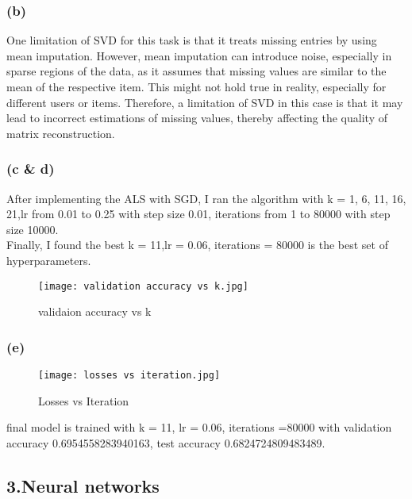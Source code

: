 \documentclass[12pt]{article}
\begin{document}
\subsubsection*{(b)}
One limitation of SVD for this task is that it treats missing entries by using mean imputation. However,
mean imputation can introduce noise, especially in sparse regions of the data, as it assumes that missing values are similar
to the mean of the respective item. This might not hold true in reality, especially for different users or items. Therefore,
a limitation of SVD in this case is that it may lead to incorrect estimations of missing values, thereby affecting the quality
of matrix reconstruction.


\subsubsection*{(c \& d)}
After implementing the ALS with SGD, I ran the algorithm with k = 1, 6, 11, 16, 21,lr from 0.01 to 0.25 with step size 0.01, iterations from 1 to 80000 with step size 10000.\\
Finally, I found the best k = 11,lr = 0.06, iterations = 80000 is the best set of hyperparameters.\\
\begin{figure}[h]
\centering
\texttt{[image: validation accuracy vs k.jpg]}
\caption{validaion accuracy vs k}
\end{figure}

\subsubsection*{(e)}
\begin{figure}[h]
\centering
\texttt{[image: losses vs iteration.jpg]}
\caption{Losses vs Iteration}
\end{figure}
final model is trained with k = 11, lr = 0.06, iterations =80000 with validation accuracy 0.6954558283940163, test accuracy 0.6824724809483489.\\
\newpage
\subsection*{3.Neural networks}
\end{document}
